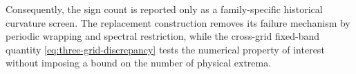 Consequently, the sign count is reported only as a family-specific historical
curvature screen.  The replacement construction removes its failure mechanism
by periodic wrapping and spectral restriction, while the cross-grid
fixed-band quantity \cref{eq:three-grid-discrepancy} tests the numerical
property of interest without imposing a bound on the number of physical
extrema.
